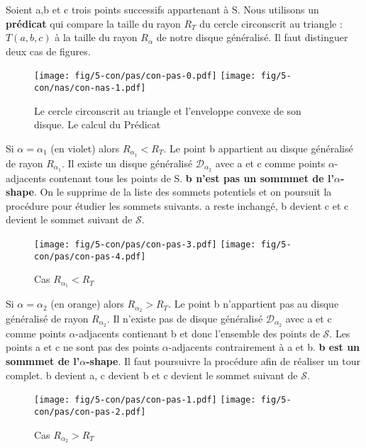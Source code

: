 Soient a,b et c trois points successifs appartenant à S. Nous utilisons un \textbf{prédicat} qui compare la taille du rayon \textbf{$R_T$} du cercle circonscrit au triangle : $T(a, b, c)$ à la taille du rayon $R_{\alpha}$ de notre disque généralisé. Il faut distinguer deux cas de figures.\\

\begin{figure}[H]
  \centering
  \texttt{[image: fig/5-con/pas/con-pas-0.pdf]}  
  \texttt{[image: fig/5-con/nas/con-nas-1.pdf]}
  \caption{Le cercle circonscrit au triangle et l'enveloppe convexe de son disque. Le calcul du Prédicat}
\end{figure}

Si $\alpha = \alpha_{1}$ (en violet) alors \textbf{$R_{\alpha_{1}} < R_T$}. Le point b appartient au disque généralisé de rayon $R_{\alpha_{1}}$. Il existe un disque généralisé $\mathcal{D}_{\alpha_2}$ avec a et c comme points $\alpha$-adjacents contenant tous les points de S. \textbf{b n'est pas un sommmet de l'$\alpha$-shape}. On le supprime de la liste des sommets potentiels et on poursuit la procédure pour étudier les sommets suivants. a reste inchangé, b devient c et c devient le sommet suivant de $\mathcal{S}$.

\begin{figure}[H]
  \centering
  \texttt{[image: fig/5-con/pas/con-pas-3.pdf]}
  \texttt{[image: fig/5-con/pas/con-pas-4.pdf]}
  \caption{Cas $R_{\alpha_{1}} < R_T$}
\end{figure}

Si $\alpha = \alpha_{2}$ (en orange) alors \textbf{$R_{\alpha_{2}} > R_T$}. Le point b n'appartient pas au disque généralisé de rayon $R_{\alpha_{2}}$. Il n'existe pas de disque généralisé $\mathcal{D}_{\alpha_2}$ avec a et c comme points $\alpha$-adjacents contienant b et donc l'ensemble des points de $\mathcal{S}$. Les points a et c ne sont pas des points $\alpha$-adjacents contrairement à a et b. \textbf{b est un sommmet de l'$\alpha$-shape}. Il faut poursuivre la procédure afin de réaliser un tour complet. b devient a, c devient b et c devient le sommet suivant de $\mathcal{S}$.\\

\begin{figure}[H]
  \centering
  \texttt{[image: fig/5-con/pas/con-pas-1.pdf]}
  \texttt{[image: fig/5-con/pas/con-pas-2.pdf]}
  \caption{Cas $R_{\alpha_{2}} > R_T$}
\end{figure}

